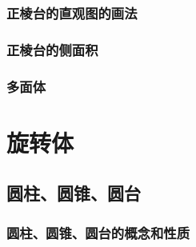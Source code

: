 \subsubsection{正棱台的直观图的画法}
\subsubsection{正棱台的侧面积}
\begin{Practice}
  \begin{question}
    \item 
    \item 
  \end{question}
\end{Practice}
\subsubsection{多面体}
\begin{Practice}
  \begin{question}
    \item 
    \item 
  \end{question}
\end{Practice}

\begin{Exercise}
  \begin{question}
    \item 
    \item 
    \item 
    \item 
    \item 
    \item 
    \item 
    \item 
    \item 
    \item 
    \item 
    \item 
  \end{question}
\end{Exercise}

\section{旋转体}
\subsection{圆柱、圆锥、圆台}
\subsubsection{圆柱、圆锥、圆台的概念和性质}
\begin{Practice}
  \begin{question}
    \item 
    \item 
    \item 
  \end{question}
\end{Practice}
